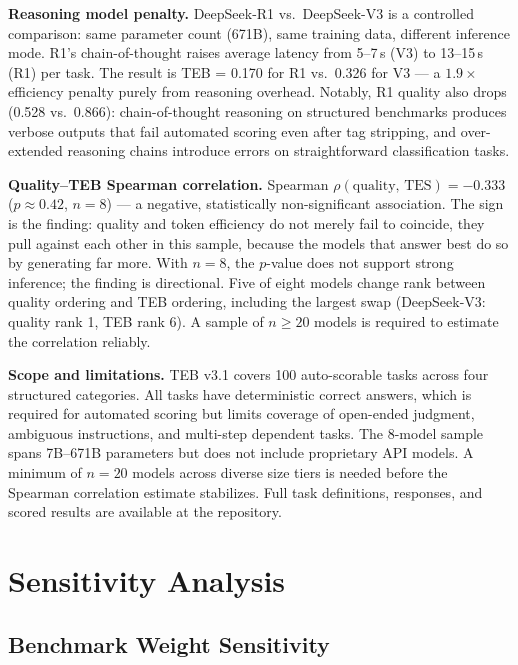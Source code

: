 \documentclass[12pt]{article}
\begin{document}
\textbf{Reasoning model penalty.} DeepSeek-R1 vs.\ DeepSeek-V3 is a controlled comparison: same parameter count (671B), same training data, different inference mode. R1's chain-of-thought raises average latency from 5--7\,s (V3) to 13--15\,s (R1) per task. The result is TEB = 0.170 for R1 vs.\ 0.326 for V3 --- a $1.9\times$ efficiency penalty purely from reasoning overhead. Notably, R1 quality also drops (0.528 vs.\ 0.866): chain-of-thought reasoning on structured benchmarks produces verbose outputs that fail automated scoring even after tag stripping, and over-extended reasoning chains introduce errors on straightforward classification tasks.

\textbf{Quality--TEB Spearman correlation.} Spearman $\rho(\text{quality},\, \text{TES}) = -0.333$ ($p \approx 0.42$, $n = 8$) --- a negative, statistically non-significant association. The sign is the finding: quality and token efficiency do not merely fail to coincide, they pull against each other in this sample, because the models that answer best do so by generating far more. With $n = 8$, the $p$-value does not support strong inference; the finding is directional. Five of eight models change rank between quality ordering and TEB ordering, including the largest swap (DeepSeek-V3: quality rank 1, TEB rank 6). A sample of $n \geq 20$ models is required to estimate the correlation reliably.

\textbf{Scope and limitations.} TEB v3.1 covers 100 auto-scorable tasks across four structured categories. All tasks have deterministic correct answers, which is required for automated scoring but limits coverage of open-ended judgment, ambiguous instructions, and multi-step dependent tasks. The 8-model sample spans 7B--671B parameters but does not include proprietary API models. A minimum of $n=20$ models across diverse size tiers is needed before the Spearman correlation estimate stabilizes. Full task definitions, responses, and scored results are available at the repository.

\section{Sensitivity Analysis}

\subsection{Benchmark Weight Sensitivity}
\end{document}

